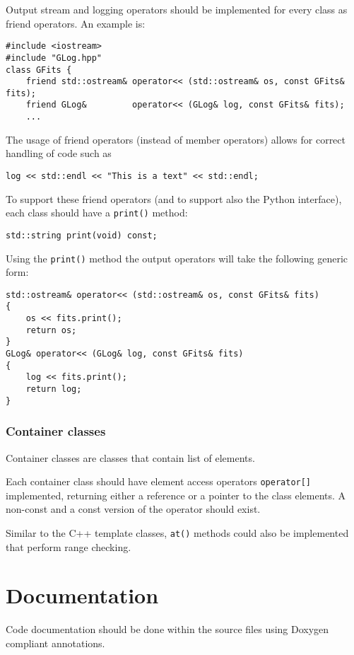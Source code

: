 \documentclass{article}[12pt,a4]
\begin{document}
Output stream and logging operators should be implemented for every class as friend
operators.
An example is:
\begin{verbatim}
#include <iostream>
#include "GLog.hpp"
class GFits {
    friend std::ostream& operator<< (std::ostream& os, const GFits& fits);
    friend GLog&         operator<< (GLog& log, const GFits& fits);
    ...
\end{verbatim}
The usage of friend operators (instead of member operators) allows for correct handling
of code such as
\begin{verbatim}
log << std::endl << "This is a text" << std::endl;
\end{verbatim}
To support these friend operators (and to support also the Python interface), each class
should have a {\tt print()} method:
\begin{verbatim}
std::string print(void) const;
\end{verbatim}
Using the {\tt print()} method the output operators will take the following generic form:
\begin{verbatim}
std::ostream& operator<< (std::ostream& os, const GFits& fits)
{
    os << fits.print();
    return os;
}
GLog& operator<< (GLog& log, const GFits& fits)
{
    log << fits.print();
    return log;
}
\end{verbatim}


\subsubsection{Container classes}

Container classes are classes that contain list of elements.

Each container class should have element access operators {\tt operator[]} implemented,
returning either a reference or a pointer to the class elements.
A non-const and a const version of the operator should exist.

Similar to the C++ template classes, {\tt at()} methods could also be implemented that
perform range checking.


\section{Documentation}

Code documentation should be done within the source files using Doxygen
compliant annotations.
\end{document}
